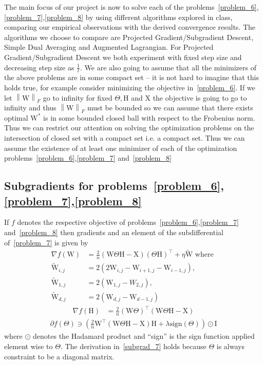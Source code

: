 \documentclass{article}
\newcommand{\0}{\mathrm{0}}
\newcommand{\1}{\mathrm{1}}
\renewcommand{\H}{\mathrm{H}}
\newcommand{\I}{\mathrm{I}}
\newcommand{\W}{\mathrm{W}}
\newcommand{\X}{\mathrm{X}}
\newcommand{\norm}[1]{\left\| #1 \right\|}
\begin{document}
The main focus of our project is now to solve each of the problems~\ref{problem_6},\ref{problem_7},\ref{problem_8} by using different algorithms explored in class, comparing our empirical observations with the derived convergence results. The algorithms we choose to compare are Projected Gradient/Subgradient Descent, Simple Dual Averaging and Augmented Lagrangian. For Projected Gradient/Subgradient Descent we both experiment with fixed step size and decreasing step size as $\frac{1}{t}$. We are also going to assume that all the minimizers of the above problems are in some compact set -- it is not hard to imagine that this holds true, for example consider minimizing the objective in~\ref{problem_6}. If we let $\norm{\W}_F$ go to infinity for fixed $\Theta,\H$ and $\X$ the objective is going to go to infinity and thus $\norm{\W}_F$ must be bounded so we can assume that there exists optimal $\W^*$ is in some bounded closed ball with respect to the Frobenius norm. Thus we can restrict our attention on solving the optimization problems on the intersection of closed set with a compact set i.e. a compact set. Thus we can assume the existence of at least one minimizer of each of the optimization problems~\ref{problem_6},\ref{problem_7} and~\ref{problem_8}
\subsection{Subgradients for problems~\ref{problem_6},\ref{problem_7},\ref{problem_8}}
If $f$ denotes the respective objective of problems~\ref{problem_6},\ref{problem_7} and~\ref{problem_8} then gradients and an element of the subdifferential of~\ref{problem_7} is given by
\begin{equation}
  \label{subgrad_6}
  \begin{aligned}
    \nabla f(\W) &= \frac{2}{n} \left(\W\Theta\H - \X\right)\left(\Theta\H\right)^\top + \eta\tilde{\W} \text{ where }\\
    \tilde{\W}_{i,j} &= 2\left(2\W_{i,j} - \W_{i+1,j} - \W_{i-1,j}\right),\\
    \tilde{\W}_{1,j} &= 2\left(\W_{1,j} - W_{2,j}\right),\\
    \tilde{\W}_{d,j} &= 2\left(\W_{d,j} - \W_{d-1,j}\right)
    \end{aligned}
\end{equation}
\begin{equation}
  \label{subgrad_8}
  \begin{aligned}
    \nabla f(\H)  &= \frac{2}{n}\left(\W\Theta\right)^\top\left(\W\Theta\H - \X\right)
  \end{aligned}
\end{equation}
\begin{equation}
  \label{subgrad_7}
  \begin{aligned}
    \partial f(\Theta) \ni \left(\frac{2}{n}\W^\top\left(\W\Theta\H-\X\right)\H +\lambda\text{sign}\left(\Theta \right)\right)\odot\I
  \end{aligned}
\end{equation}
where $\odot$ denotes the Hadamard product and ``sign'' is the sign function applied element wise to $\Theta$. The derivation in~\ref{subgrad_7} holds because $\Theta$ is always constraint to be a diagonal matrix.
\end{document}
